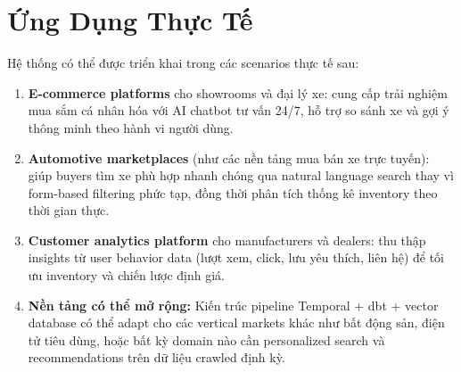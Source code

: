 \section{Ứng Dụng Thực Tế}

Hệ thống có thể được triển khai trong các scenarios thực tế sau:

\begin{enumerate}
    \item \textbf{E-commerce platforms} cho showrooms và đại lý xe: cung cấp trải nghiệm mua sắm cá nhân hóa với AI chatbot tư vấn 24/7, hỗ trợ so sánh xe và gợi ý thông minh theo hành vi người dùng.

    \item \textbf{Automotive marketplaces} (như các nền tảng mua bán xe trực tuyến): giúp buyers tìm xe phù hợp nhanh chóng qua natural language search thay vì form-based filtering phức tạp, đồng thời phân tích thống kê inventory theo thời gian thực.

    \item \textbf{Customer analytics platform} cho manufacturers và dealers: thu thập insights từ user behavior data (lượt xem, click, lưu yêu thích, liên hệ) để tối ưu inventory và chiến lược định giá.

    \item \textbf{Nền tảng có thể mở rộng:} Kiến trúc pipeline Temporal + dbt + vector database có thể adapt cho các vertical markets khác như bất động sản, điện tử tiêu dùng, hoặc bất kỳ domain nào cần personalized search và recommendations trên dữ liệu crawled định kỳ.
\end{enumerate}
